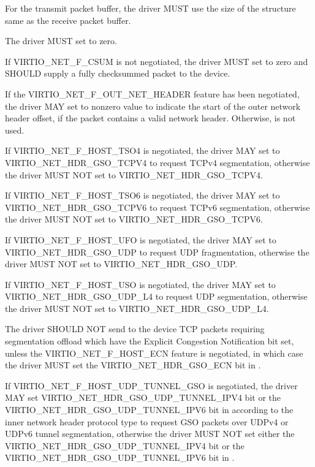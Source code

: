 
For the transmit packet buffer, the driver MUST use the size of the
structure  same as the receive packet buffer.

The driver MUST set  to zero.

If VIRTIO_NET_F_CSUM is not negotiated, the driver MUST set
 to zero and SHOULD supply a fully checksummed
packet to the device.

If the VIRTIO_NET_F_OUT_NET_HEADER feature has been negotiated,
the driver MAY set  to nonzero value to indicate
the start of the outer network header offset, if the packet contains a
valid network header. Otherwise,  is not used.

If VIRTIO_NET_F_HOST_TSO4 is negotiated, the driver MAY set
 to VIRTIO_NET_HDR_GSO_TCPV4 to request TCPv4
segmentation, otherwise the driver MUST NOT set
 to VIRTIO_NET_HDR_GSO_TCPV4.

If VIRTIO_NET_F_HOST_TSO6 is negotiated, the driver MAY set
 to VIRTIO_NET_HDR_GSO_TCPV6 to request TCPv6
segmentation, otherwise the driver MUST NOT set
 to VIRTIO_NET_HDR_GSO_TCPV6.

If VIRTIO_NET_F_HOST_UFO is negotiated, the driver MAY set
 to VIRTIO_NET_HDR_GSO_UDP to request UDP
fragmentation, otherwise the driver MUST NOT set
 to VIRTIO_NET_HDR_GSO_UDP.

If VIRTIO_NET_F_HOST_USO is negotiated, the driver MAY set
 to VIRTIO_NET_HDR_GSO_UDP_L4 to request UDP
segmentation, otherwise the driver MUST NOT set
 to VIRTIO_NET_HDR_GSO_UDP_L4.

The driver SHOULD NOT send to the device TCP packets requiring segmentation offload
which have the Explicit Congestion Notification bit set, unless the
VIRTIO_NET_F_HOST_ECN feature is negotiated, in which case the
driver MUST set the VIRTIO_NET_HDR_GSO_ECN bit in
.

If VIRTIO_NET_F_HOST_UDP_TUNNEL_GSO is negotiated, the driver MAY set
VIRTIO_NET_HDR_GSO_UDP_TUNNEL_IPV4 bit or the VIRTIO_NET_HDR_GSO_UDP_TUNNEL_IPV6 bit
in  according to the inner network header protocol type
to request GSO packets over UDPv4 or UDPv6 tunnel segmentation,
otherwise the driver MUST NOT set either the
VIRTIO_NET_HDR_GSO_UDP_TUNNEL_IPV4 bit or the VIRTIO_NET_HDR_GSO_UDP_TUNNEL_IPV6 bit
in .

